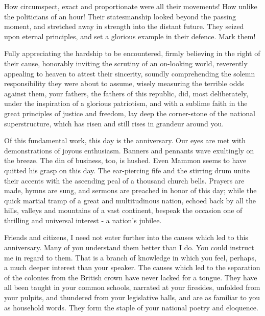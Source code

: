 How circumspect, exact and proportionate were all their movements! How unlike the politicians of an hour! Their statesmanship looked beyond the passing moment, and stretched away in strength into the distant future. They seized upon eternal principles, and set a glorious example in their defence. Mark them!\par

Fully appreciating the hardship to be encountered, firmly believing in the right of their cause, honorably inviting the scrutiny of an on-looking world, reverently appealing to heaven to attest their sincerity, soundly comprehending the solemn responsibility they were about to assume, wisely measuring the terrible odds against them, your fathers, the fathers of this republic, did, most deliberately, under the inspiration of a glorious patriotism, and with a sublime faith in the great principles of justice and freedom, lay deep the corner-stone of the national superstructure, which has risen and still rises in grandeur around you.\par

Of this fundamental work, this day is the anniversary. Our eyes are met with demonstrations of joyous enthusiasm. Banners and pennants wave exultingly on the breeze. The din of business, too, is hushed. Even Mammon seems to have quitted his grasp on this day. The ear-piercing fife and the stirring drum unite their accents with the ascending peal of a thousand church bells. Prayers are made, hymns are sung, and sermons are preached in honor of this day; while the quick martial tramp of a great and multitudinous nation, echoed back by all the hills, valleys and mountains of a vast continent, bespeak the occasion one of thrilling and universal interest - a nation’s jubilee.\par

Friends and citizens, I need not enter further into the causes which led to this anniversary. Many of you understand them better than I do. You could instruct me in regard to them. That is a branch of knowledge in which you feel, perhaps, a much deeper interest than your speaker. The causes which led to the separation of the colonies from the British crown have never lacked for a tongue. They have all been taught in your common schools, narrated at your firesides, unfolded from your pulpits, and thundered from your legislative halls, and are as familiar to you as household words. They form the staple of your national poetry and eloquence.\par

